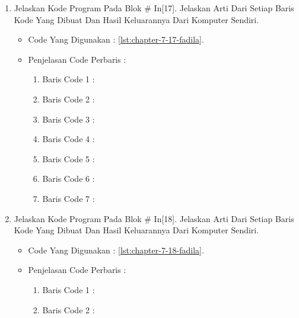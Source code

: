 \begin{enumerate}
\begin{itemize}
\begin{enumerate}
\end{enumerate}
\par
\end{itemize}
\par
\par
\par
\item Jelaskan Kode Program Pada Blok \# In[17]. Jelaskan Arti Dari Setiap Baris Kode Yang Dibuat Dan Hasil Keluarannya Dari Komputer Sendiri.
\begin{itemize}
\item Code Yang Digunakan : \ref{lst:chapter-7-17-fadila}.

\par
\par
\item Penjelasan Code Perbaris	: 
\begin{enumerate}
\item Baris Code 1	:
\item Baris Code 2	:
\item Baris Code 3	:
\item Baris Code 4	:
\item Baris Code 5	:
\item Baris Code 6	:
\item Baris Code 7	:
\end{enumerate}
\par
\par
\end{itemize}
\par
\par
\par
\item Jelaskan Kode Program Pada Blok \# In[18]. Jelaskan Arti Dari Setiap Baris Kode Yang Dibuat Dan Hasil Keluarannya Dari Komputer Sendiri.
\begin{itemize}
\item Code Yang Digunakan : \ref{lst:chapter-7-18-fadila}.

\par
\par
\item Penjelasan Code Perbaris	: 
\begin{enumerate}
\item Baris Code 1	:
\item Baris Code 2	:

\end{enumerate}
\end{itemize}
\end{enumerate}
